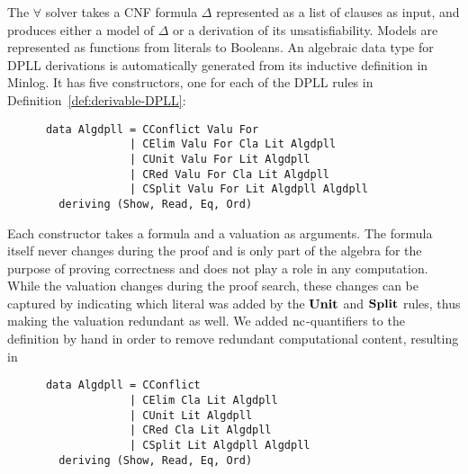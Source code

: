 %
%
The $\forall$ solver takes a CNF formula $\Delta$ represented as a list of
clauses as input, and produces either a model of $\Delta$ or a
derivation of its unsatisfiability.
%
%
Models are represented as functions from literals to Booleans. An
algebraic data type for DPLL derivations is automatically generated
from its inductive definition in Minlog. It has five constructors, one
for each of the DPLL rules in Definition~\ref{def:derivable-DPLL}:
\begin{verbatim}
      data Algdpll = CConflict Valu For
                   | CElim Valu For Cla Lit Algdpll
                   | CUnit Valu For Lit Algdpll
                   | CRed Valu For Cla Lit Algdpll
                   | CSplit Valu For Lit Algdpll Algdpll
        deriving (Show, Read, Eq, Ord)
\end{verbatim}
%
Each constructor takes a formula and a valuation as arguments. The
formula itself never changes during the proof and is only part of the algebra for the purpose of proving correctness and does not play a role in any computation. While the valuation changes
during the proof search, these changes can be captured by indicating
which literal was added by the $\mathbf{Unit}$ and $\mathbf{Split}$ rules, thus making
the valuation redundant as well.  We added $\mathrm{nc}$-quantifiers to the
definition by hand in order to remove redundant
computational content, resulting in
%
\begin{verbatim}
      data Algdpll = CConflict
                   | CElim Cla Lit Algdpll
                   | CUnit Lit Algdpll
                   | CRed Cla Lit Algdpll
                   | CSplit Lit Algdpll Algdpll
        deriving (Show, Read, Eq, Ord)
\end{verbatim}
%
%

